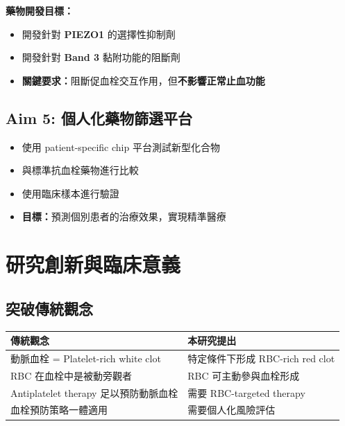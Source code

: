 \documentclass[12pt,a4paper]{article}
\begin{document}
\begin{importantbox}
\textbf{藥物開發目標：}
\begin{itemize}[leftmargin=2em]
    \item 開發針對 \textbf{PIEZO1} 的選擇性抑制劑
    \item 開發針對 \textbf{Band 3} 黏附功能的阻斷劑
    \item \textbf{關鍵要求：}阻斷促血栓交互作用，但\textbf{不影響正常止血功能}
\end{itemize}
\end{importantbox}

\subsection{Aim 5: 個人化藥物篩選平台}

\begin{itemize}[leftmargin=2em]
    \item 使用 patient-specific chip 平台測試新型化合物
    \item 與標準抗血栓藥物進行比較
    \item 使用臨床樣本進行驗證
    \item \textbf{目標：}預測個別患者的治療效果，實現精準醫療
\end{itemize}

\section{研究創新與臨床意義}

\subsection{突破傳統觀念}

\begin{center}
\begin{tabular}{p{6cm}p{7cm}}
\toprule
\textbf{傳統觀念} & \textbf{本研究提出} \\
\midrule
動脈血栓 = Platelet-rich white clot & 特定條件下形成 RBC-rich red clot \\
\midrule
RBC 在血栓中是被動旁觀者 & RBC 可主動參與血栓形成 \\
\midrule
Antiplatelet therapy 足以預防動脈血栓 & 需要 RBC-targeted therapy \\
\midrule
血栓預防策略一體適用 & 需要個人化風險評估 \\
\bottomrule
\end{tabular}
\end{center}
\end{document}
